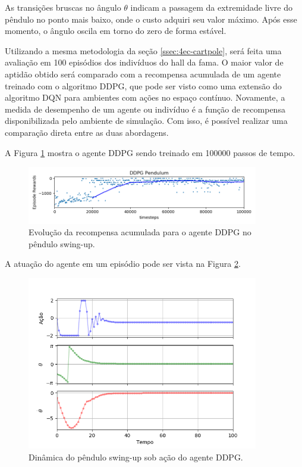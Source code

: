 As transições bruscas no ângulo $\theta$ indicam a passagem da extremidade livre do pêndulo no ponto mais baixo, onde o custo adquiri seu valor máximo. Após esse momento, o ângulo oscila em torno do zero de forma estável.

Utilizando a mesma metodologia da seção \ref{ssec:4ec-cartpole}, será feita uma avaliação em 100 episódios dos indivíduos do hall da fama. O maior valor de aptidão obtido será comparado com a recompensa acumulada de um agente treinado com o algoritmo DDPG, que pode ser visto como uma extensão do algoritmo DQN para ambientes com ações no espaço contínuo. Novamente, a medida de desempenho de um agente ou indivíduo é a função de recompensa disponibilizada pelo ambiente de simulação. Com isso, é possível realizar uma comparação direta entre as duas abordagens.

A Figura \ref{fig:4ec-pendulumddpggraf} mostra o agente DDPG sendo treinado em 100000 passos de tempo.

\begin{figure}[H]
	\centering
	\includegraphics[width=0.9\textwidth]{02_desenvolvimento/04_EC_Fig_PendulumDDPGGraf.png}
	\caption{Evolução da recompensa acumulada para o agente DDPG no pêndulo swing-up.}
	\label{fig:4ec-pendulumddpggraf}
\end{figure}

A atuação do agente em um episódio pode ser vista na Figura \ref{fig:4ec-pendulumddpgvargraf}. 

\begin{figure}[H]
	\centering
	\includegraphics[width=0.9\textwidth]{02_desenvolvimento/04_EC_Fig_PendulumDDPGVarGraf.png}
	\caption{Dinâmica do pêndulo swing-up sob ação do agente DDPG.}
	\label{fig:4ec-pendulumddpgvargraf}
\end{figure}


